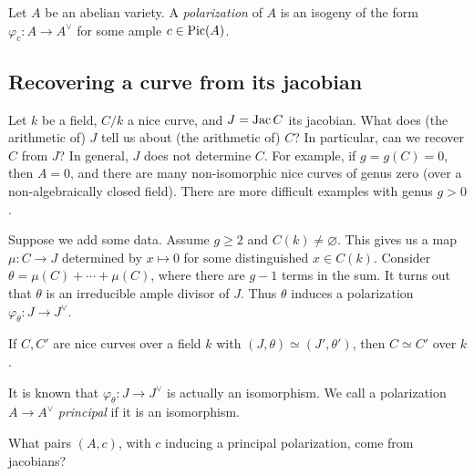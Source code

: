\documentclass{article}
\begin{document}
\begin{definition}
Let $A$ be an abelian variety. A \emph{polarization} of $A$ is an isogeny 
of the form $\varphi_c:A\to A^\vee$ for some ample $c\in \operatorname{Pic}(A)$.
\end{definition}





\subsection*{Recovering a curve from its jacobian}

Let $k$ be a field, $C/k$ a nice curve, and $J=\operatorname{Jac} C$ its jacobian. What does 
(the arithmetic of) $J$ tell us about (the arithmetic of) $C$? In particular, 
can we recover $C$ from $J$? In general, $J$ does not determine $C$. For 
example, if $g=g(C)=0$, then $A=0$, and there are many non-isomorphic nice 
curves of genus zero (over a non-algebraically closed field). There are more 
difficult examples with genus $g>0$. 

Suppose we add some data. Assume $g\geqslant 2$ and $C(k)\ne\varnothing$. This 
gives us a map $\mu:C\to J$ determined by $x\mapsto 0$ for some distinguished 
$x\in C(k)$. Consider $\theta = \mu(C)+\cdots + \mu(C)$, where there are $g-1$ 
terms in the sum. It turns out that $\theta$ is an irreducible ample divisor of 
$J$. Thus $\theta$ induces a polarization $\varphi_\theta:J\to J^\vee$. 

\begin{theorem}[Torelli]
If $C,C'$ are nice curves over a field $k$ with $(J,\theta)\simeq (J',\theta')$, 
then $C\simeq C'$ over $k$. 
\end{theorem}

It is known that $\varphi_\theta:J\to J^\vee$ is actually an isomorphism. We 
call a polarization $A\to A^\vee$ \emph{principal} if it is an isomorphism. 

\begin{question}[Schottky]
What pairs $(A,c)$, with $c$ inducing a principal polarization, come from 
jacobians? 
\end{question}
\end{document}
